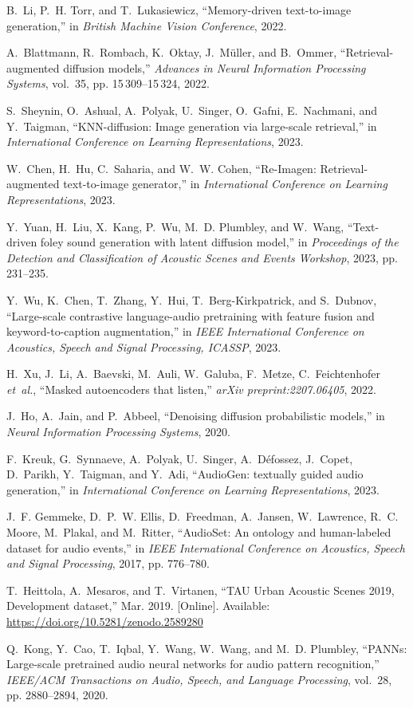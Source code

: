 \documentclass{article}
\begin{document}
\begin{thebibliography}{10}
B.~Li, P.~H. Torr, and T.~Lukasiewicz, ``Memory-driven text-to-image generation,'' in \emph{British Machine Vision Conference}, 2022.

A.~Blattmann, R.~Rombach, K.~Oktay, J.~M{\"u}ller, and B.~Ommer, ``Retrieval-augmented diffusion models,'' \emph{Advances in Neural Information Processing Systems}, vol.~35, pp. 15\,309--15\,324, 2022.

S.~Sheynin, O.~Ashual, A.~Polyak, U.~Singer, O.~Gafni, E.~Nachmani, and Y.~Taigman, ``{KNN}-diffusion: Image generation via large-scale retrieval,'' in \emph{International Conference on Learning Representations}, 2023.

W.~Chen, H.~Hu, C.~Saharia, and W.~W. Cohen, ``{Re-Imagen}: Retrieval-augmented text-to-image generator,'' in \emph{International Conference on Learning Representations}, 2023.

Y.~Yuan, H.~Liu, X.~Kang, P.~Wu, M.~D. Plumbley, and W.~Wang, ``Text-driven foley sound generation with latent diffusion model,'' in \emph{Proceedings of the Detection and Classification of Acoustic Scenes and Events Workshop}, 2023, pp. 231--235.

Y.~Wu, K.~Chen, T.~Zhang, Y.~Hui, T.~Berg-Kirkpatrick, and S.~Dubnov, ``Large-scale contrastive language-audio pretraining with feature fusion and keyword-to-caption augmentation,'' in \emph{IEEE International Conference on Acoustics, Speech and Signal Processing, ICASSP}, 2023.

H.~Xu, J.~Li, A.~Baevski, M.~Auli, W.~Galuba, F.~Metze, C.~Feichtenhofer \emph{et~al.}, ``Masked autoencoders that listen,'' \emph{arXiv preprint:2207.06405}, 2022.

J.~Ho, A.~Jain, and P.~Abbeel, ``Denoising diffusion probabilistic models,'' in \emph{{Neural Information Processing Systems}}, 2020.

F.~{Kreuk}, G.~{Synnaeve}, A.~{Polyak}, U.~{Singer}, A.~{D{\'e}fossez}, J.~{Copet}, D.~{Parikh}, Y.~{Taigman}, and Y.~{Adi}, ``{AudioGen: textually guided audio generation},'' in \emph{International Conference on Learning Representations}, 2023.

J.~F. Gemmeke, D.~P.~W. Ellis, D.~Freedman, A.~Jansen, W.~Lawrence, R.~C. Moore, M.~Plakal, and M.~Ritter, ``{AudioSet}: An ontology and human-labeled dataset for audio events,'' in \emph{IEEE International Conference on Acoustics, Speech and Signal Processing}, 2017, pp. 776--780.

\BIBentryALTinterwordspacing
T.~Heittola, A.~Mesaros, and T.~Virtanen, ``{TAU Urban Acoustic Scenes 2019, Development dataset},'' Mar. 2019. [Online]. Available: \url{https://doi.org/10.5281/zenodo.2589280}
\BIBentrySTDinterwordspacing

Q.~Kong, Y.~Cao, T.~Iqbal, Y.~Wang, W.~Wang, and M.~D. Plumbley, ``{PANNs}: Large-scale pretrained audio neural networks for audio pattern recognition,'' \emph{IEEE/ACM Transactions on Audio, Speech, and Language Processing}, vol.~28, pp. 2880--2894, 2020.

\end{thebibliography}
\end{document}
